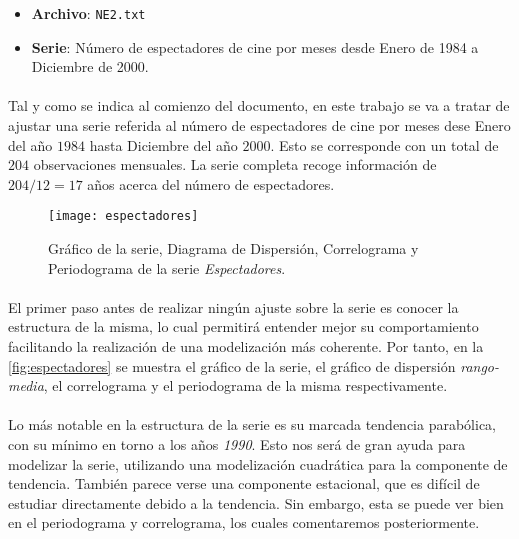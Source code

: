 \documentclass[a4paper, spanish]{article}
\begin{document}
  \maketitle

  \begin{itemize}
    \item \textbf{Archivo}: \texttt{NE2.txt}
    \item \textbf{Serie}: Número de espectadores de cine por meses desde Enero de 1984 a Diciembre de 2000.
  \end{itemize}

    \paragraph{}
    Tal y como se indica al comienzo del documento, en este trabajo se va a tratar de ajustar una serie referida al número de espectadores de cine por meses dese Enero del año $1984$ hasta Diciembre del año $2000$. Esto se corresponde con un total de $204$ observaciones mensuales. La serie completa recoge información de $204 / 12 = 17$ años acerca del número de espectadores.

    \begin{figure}[htb!]
      \texttt{[image: espectadores]}
      \caption{Gráfico de la serie, Diagrama de Dispersión, Correlograma y Periodograma de la serie \emph{Espectadores}.}
      \label{fig:espectadores}
    \end{figure}

    \paragraph{}
    El primer paso antes de realizar ningún ajuste sobre la serie es conocer la estructura de la misma, lo cual permitirá entender mejor su comportamiento facilitando la realización de una modelización más coherente. Por tanto, en la \autoref{fig:espectadores} se muestra el gráfico de la serie, el gráfico de dispersión \emph{rango-media}, el correlograma y el periodograma de la misma respectivamente.

    \paragraph{}
    Lo más notable en la estructura de la serie es su marcada tendencia parabólica, con su mínimo en torno a los años \emph{1990}. Esto nos será de gran ayuda para modelizar la serie, utilizando una modelización cuadrática para la componente de tendencia. También parece verse una componente estacional, que es difícil de estudiar directamente debido a la tendencia. Sin embargo, esta se puede ver bien en el periodograma y correlograma, los cuales comentaremos posteriormente.
\end{document}
